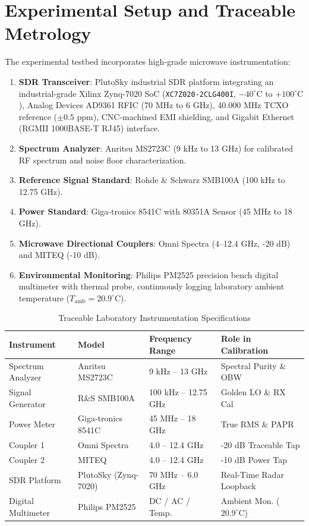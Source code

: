 \documentclass[journal,compsoc]{IEEEtran}
\begin{document}
\section{Experimental Setup and Traceable Metrology}
The experimental testbed incorporates high-grade microwave instrumentation:
\begin{enumerate}
    \item \textbf{SDR Transceiver}: PlutoSky industrial SDR platform integrating an industrial-grade Xilinx Zynq-7020 SoC (\texttt{XC7Z020-2CLG400I}, $-40^\circ\text{C}$ to $+100^\circ\text{C}$), Analog Devices AD9361 RFIC (70 MHz to 6 GHz), 40.000 MHz TCXO reference ($\pm 0.5\text{ ppm}$), CNC-machined EMI shielding, and Gigabit Ethernet (RGMII 1000BASE-T RJ45) interface.
    \item \textbf{Spectrum Analyzer}: Anritsu MS2723C (9 kHz to 13 GHz) for calibrated RF spectrum and noise floor characterization.
    \item \textbf{Reference Signal Standard}: Rohde \& Schwarz SMB100A (100 kHz to 12.75 GHz).
    \item \textbf{Power Standard}: Giga-tronics 8541C with 80351A Sensor (45 MHz to 18 GHz).
    \item \textbf{Microwave Directional Couplers}: Omni Spectra (4--12.4 GHz, -20 dB) and MITEQ (-10 dB).
    \item \textbf{Environmental Monitoring}: Philips PM2525 precision bench digital multimeter with thermal probe, continuously logging laboratory ambient temperature ($T_{\text{amb}} = 20.9^\circ\text{C}$).
\end{enumerate}

\begin{table}[t]
\centering
\caption{Traceable Laboratory Instrumentation Specifications}
\label{tab:instruments}
\begin{tabular}{llll}
\toprule
\textbf{Instrument} & \textbf{Model} & \textbf{Frequency Range} & \textbf{Role in Calibration} \\
\midrule
Spectrum Analyzer & Anritsu MS2723C & 9 kHz -- 13 GHz & Spectral Purity \& OBW \\
Signal Generator & R\&S SMB100A & 100 kHz -- 12.75 GHz & Golden LO \& RX Cal \\
Power Meter & Giga-tronics 8541C & 45 MHz -- 18 GHz & True RMS \& PAPR \\
Coupler 1 & Omni Spectra & 4.0 -- 12.4 GHz & -20 dB Traceable Tap \\
Coupler 2 & MITEQ & 4.0 -- 12.4 GHz & -10 dB Power Tap \\
SDR Platform & PlutoSky (Zynq-7020) & 70 MHz -- 6.0 GHz & Real-Time Radar Loopback \\
Digital Multimeter & Philips PM2525 & DC / AC / Temp. & Ambient Mon. ($20.9^\circ\text{C}$) \\
\bottomrule
\end{tabular}
\end{table}
\end{document}
